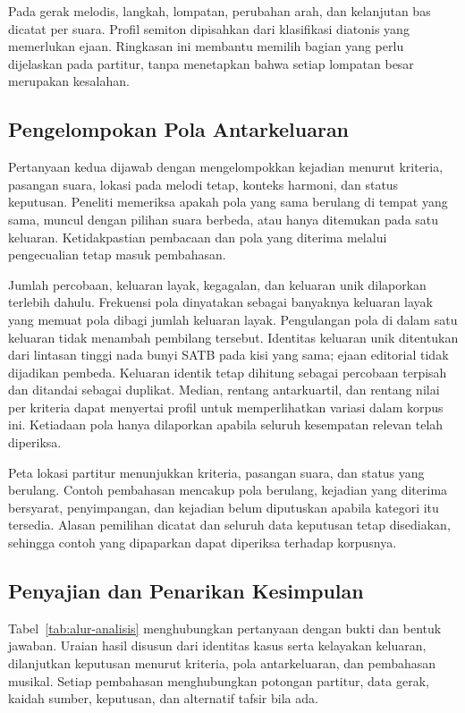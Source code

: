 Pada gerak melodis, langkah, lompatan, perubahan arah, dan kelanjutan bas dicatat per suara. Profil semiton dipisahkan dari klasifikasi diatonis yang memerlukan ejaan. Ringkasan ini membantu memilih bagian yang perlu dijelaskan pada partitur, tanpa menetapkan bahwa setiap lompatan besar merupakan kesalahan.

\subsection{Pengelompokan Pola Antarkeluaran}

Pertanyaan kedua dijawab dengan mengelompokkan kejadian menurut kriteria, pasangan suara, lokasi pada melodi tetap, konteks harmoni, dan status keputusan. Peneliti memeriksa apakah pola yang sama berulang di tempat yang sama, muncul dengan pilihan suara berbeda, atau hanya ditemukan pada satu keluaran. Ketidakpastian pembacaan dan pola yang diterima melalui pengecualian tetap masuk pembahasan.

Jumlah percobaan, keluaran layak, kegagalan, dan keluaran unik dilaporkan terlebih dahulu. Frekuensi pola dinyatakan sebagai banyaknya keluaran layak yang memuat pola dibagi jumlah keluaran layak. Pengulangan pola di dalam satu keluaran tidak menambah pembilang tersebut. Identitas keluaran unik ditentukan dari lintasan tinggi nada bunyi SATB pada kisi yang sama; ejaan editorial tidak dijadikan pembeda. Keluaran identik tetap dihitung sebagai percobaan terpisah dan ditandai sebagai duplikat. Median, rentang antarkuartil, dan rentang nilai per kriteria dapat menyertai profil untuk memperlihatkan variasi dalam korpus ini. Ketiadaan pola hanya dilaporkan apabila seluruh kesempatan relevan telah diperiksa.

Peta lokasi partitur menunjukkan kriteria, pasangan suara, dan status yang berulang. Contoh pembahasan mencakup pola berulang, kejadian yang diterima bersyarat, penyimpangan, dan kejadian belum diputuskan apabila kategori itu tersedia. Alasan pemilihan dicatat dan seluruh data keputusan tetap disediakan, sehingga contoh yang dipaparkan dapat diperiksa terhadap korpusnya.

\subsection{Penyajian dan Penarikan Kesimpulan}

Tabel~\ref{tab:alur-analisis} menghubungkan pertanyaan dengan bukti dan bentuk jawaban. Uraian hasil disusun dari identitas kasus serta kelayakan keluaran, dilanjutkan keputusan menurut kriteria, pola antarkeluaran, dan pembahasan musikal. Setiap pembahasan menghubungkan potongan partitur, data gerak, kaidah sumber, keputusan, dan alternatif tafsir bila ada.

